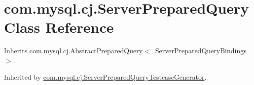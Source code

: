 \hypertarget{classcom_1_1mysql_1_1cj_1_1_server_prepared_query}{}\section{com.\+mysql.\+cj.\+Server\+Prepared\+Query Class Reference}
\label{classcom_1_1mysql_1_1cj_1_1_server_prepared_query}


Inherits \mbox{\hyperlink{classcom_1_1mysql_1_1cj_1_1_abstract_prepared_query}{com.\+mysql.\+cj.\+Abstract\+Prepared\+Query$<$ Server\+Prepared\+Query\+Bindings $>$}}.



Inherited by \mbox{\hyperlink{classcom_1_1mysql_1_1cj_1_1_server_prepared_query_testcase_generator}{com.\+mysql.\+cj.\+Server\+Prepared\+Query\+Testcase\+Generator}}.

